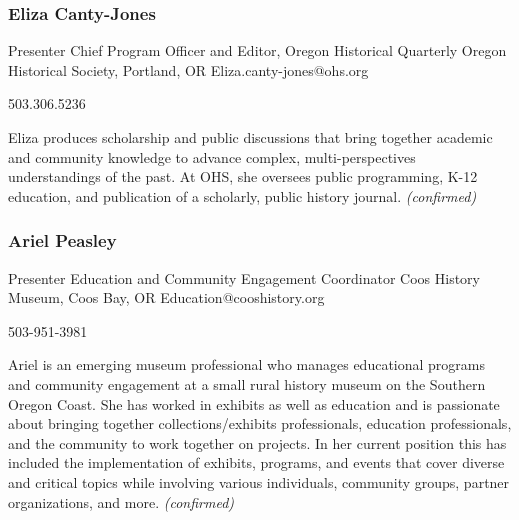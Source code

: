 \documentclass{report}
\begin{document}
              
                \subsubsection*{ Eliza Canty-Jones }
                Presenter\newline
                Chief Program Officer and Editor, Oregon Historical Quarterly\newline
                Oregon Historical Society, Portland, OR
                \newline
                Eliza.canty-jones@ohs.org\newline
                
                503.306.5236\newline

                Eliza produces scholarship and public discussions that bring together academic and community knowledge to advance complex, multi-perspectives understandings of the past. At OHS, she oversees public programming, K-12 education, and publication of a scholarly, public history journal.
                \emph{ (confirmed) }
              

              
                \subsubsection*{ Ariel  Peasley }
                Presenter\newline
                Education and Community Engagement Coordinator\newline
                Coos History Museum, Coos Bay, OR
                \newline
                Education@cooshistory.org\newline
                
                503-951-3981\newline

                Ariel is an emerging museum professional who manages educational programs and community engagement at a small rural history museum on the Southern Oregon Coast. She has worked in exhibits as well as education and is passionate about bringing together collections/exhibits professionals, education professionals, and the community to work together on projects. In her current position this has included the implementation of exhibits, programs, and events that cover diverse and critical topics while involving various individuals, community groups, partner organizations, and more.
                \emph{ (confirmed) }
              
\end{document}
